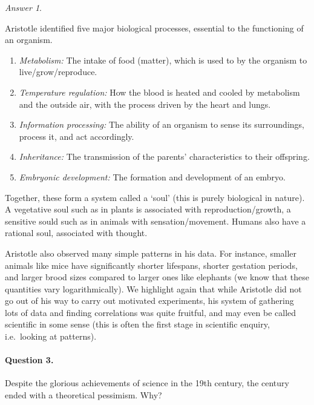 \documentclass[11pt]{article}
\theoremstyle{remark}
\newtheorem*{answer}{Answer}
\begin{document}
\begin{answer}
\begin{enumerate}
            Aristotle identified five major biological processes, essential to the
            functioning of an organism. 
            \begin{enumerate}
                \item \textit{Metabolism:} The intake of food (matter), which is used
                to by the organism to live/grow/reproduce.
                \item \textit{Temperature regulation:} How the blood is heated and
                cooled by metabolism and the outside air, with the process driven by
                the heart and lungs.
                \item \textit{Information processing:} The ability of an organism to
                sense its surroundings, process it, and act accordingly.
                \item \textit{Inheritance:} The transmission of the parents'
                characteristics to their offspring.
                \item \textit{Embryonic development:} The formation and development
                of an embryo.
            \end{enumerate}
            Together, these form a system called a `soul'
            (this is purely biological in nature). A vegetative soul such as in
            plants is associated with reproduction/growth, a sensitive sould such as
            in animals with sensation/movement. Humans also have a rational soul,
            associated with thought.

            Aristotle also observed many simple patterns in his data. For instance,
            smaller animals like mice have significantly shorter lifespans, shorter
            gestation periods, and larger brood sizes compared to larger ones like
            elephants (we know that these quantities vary logarithmically). We
            highlight again that while Aristotle did not go out of his way to carry
            out motivated experiments, his system of gathering lots of data and
            finding correlations was quite fruitful, and may even be called
            scientific in some sense (this is often the first stage in scientific
            enquiry, i.e.\ looking at patterns).
        \end{enumerate}
    \end{answer}

    \paragraph{Question 3.} Despite the glorious achievements of science in the 19th
    century, the century ended with a theoretical pessimism. Why?
\end{document}
